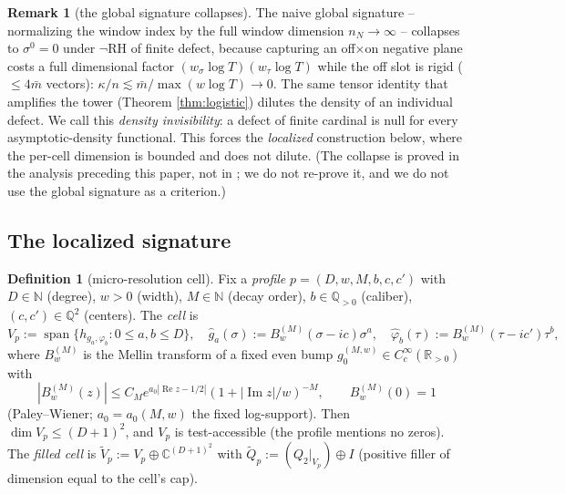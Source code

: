 \documentclass[11pt,reqno]{amsart}
\theoremstyle{definition}
\newtheorem{definition}[theorem]{Definition}
\newtheorem{remark}[theorem]{Remark}
\newcommand{\R}{\mathbb{R}}
\newcommand{\C}{\mathbb{C}}
\newcommand{\N}{\mathbb{N}}
\begin{document}
\begin{remark}[the global signature collapses]\label{rem:collapse}
The naive global signature -- normalizing the window index by the full window
dimension \(n_N\to\infty\) -- collapses to \(\sigma^0=0\) under \(\neg\)RH of
finite defect, because capturing an off\(\times\)on negative plane costs a full
dimensional factor \((w_\sigma\log T)(w_\tau\log T)\) while the off slot is rigid
(\(\leq4\bar m\) vectors): \(\kappa/n\lesssim\bar m/\max(w\log T)\to0\). The same
tensor identity that amplifies the tower (Theorem \ref{thm:logistic}) dilutes the
density of an individual defect. We call this \emph{density invisibility}: a
defect of finite cardinal is null for every asymptotic-density functional. This
forces the \emph{localized} construction below, where the per-cell dimension is
bounded and does not dilute. (The collapse is proved in the analysis preceding this paper, not in \cite{P40}; we do not re-prove it, and we
do not use the global signature as a criterion.)
\end{remark}

\subsection{The localized signature}

\begin{definition}[micro-resolution cell]\label{def:cell}
Fix a \emph{profile} \(p=(D,w,M,b,c,c')\) with \(D\in\N\) (degree), \(w>0\)
(width), \(M\in\N\) (decay order), \(b\in\mathbb Q_{>0}\) (caliber),
\((c,c')\in\mathbb Q^2\) (centers). The \emph{cell} is
\[
V_p:=\operatorname{span}\bigl\{h_{g_a,\varphi_b}:0\leq a,b\leq D\bigr\},\quad
\hat g_a(\sigma):=B^{(M)}_w(\sigma-ic)\sigma^a,\quad
\hat\varphi_b(\tau):=B^{(M)}_w(\tau-ic')\tau^b,
\]
where \(B^{(M)}_w\) is the Mellin transform of a fixed even bump
\(g_0^{(M,w)}\in C_c^\infty(\R_{>0})\) with
\[
|B^{(M)}_w(z)|\leq C_M e^{a_0|\operatorname{Re}z-1/2|}
(1+|\operatorname{Im}z|/w)^{-M},\qquad B^{(M)}_w(0)=1
\tag{$\ast$}
\]
(Paley--Wiener; \(a_0=a_0(M,w)\) the fixed log-support). Then \(\dim V_p\leq
(D+1)^2\), and \(V_p\) is test-accessible (the profile mentions no zeros). The
\emph{filled cell} is \(\tilde V_p:=V_p\oplus\C^{(D+1)^2}\) with
\(\tilde Q_p:=(Q_2|_{V_p})\oplus I\) (positive filler of dimension equal to the
cell's cap).
\end{definition}
\end{document}

